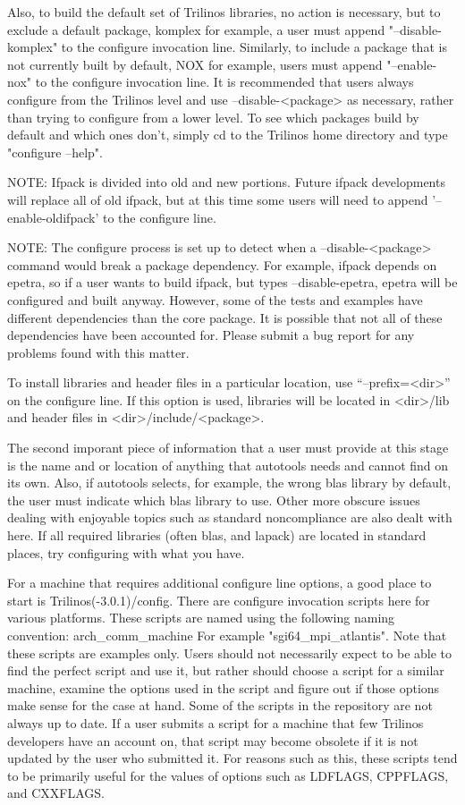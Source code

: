 \documentclass[12pt,relax]{TrilinosDevGuide}
\begin{document}
	Also, to build the default set of Trilinos libraries, no action is 
necessary, but to exclude a default package, komplex for example, a user must 
append "--disable-komplex" to the configure invocation  line.  Similarly, to 
include a package that is not currently built by default, NOX for example, 
users must append "--enable-nox" to the configure invocation line.  It is 
recommended that users always configure from the Trilinos level and use 
--disable-<package> as necessary, rather than trying to configure from a lower 
level.  To see which packages build by default and which ones don't, simply 
cd to the Trilinos home directory and type "configure --help".

NOTE: Ifpack is divided into old and new portions.  Future ifpack developments 
will replace all of old ifpack, but at this time some users will need to append
'--enable-oldifpack' to the configure line.

NOTE: The configure process is set up to detect when a --disable-<package> 
command would break a package dependency.  For example, ifpack depends on 
epetra, so if a user wants to build ifpack, but types --disable-epetra, epetra 
will be configured and built anyway.  However, some of the tests and examples 
have different dependencies than the core package.  It is possible that not 
all of these dependencies have been accounted for.  Please submit a bug report 
for any problems found with this matter.

	To install libraries and header files in a particular location, 
use ``--prefix=<dir>'' on the configure line.  If this option is used, 
libraries will be located in <dir>/lib and header files in 
<dir>/include/<package>.

	The second imporant piece of information that a user must provide at 
this stage is the name and or location of anything that autotools needs and 
cannot find on its own.  Also, if autotools selects, for example, the wrong 
blas library by default, the user must indicate which blas library to use.  
Other more obscure issues dealing with enjoyable topics such as standard 
noncompliance are also dealt with here.  If all required libraries (often 
blas, and lapack) are located in standard places, try configuring with what 
you have.

	For a machine that requires additional configure line options, a good 
place to start is Trilinos(-3.0.1)/config.  There are configure invocation 
scripts here for various platforms.  These scripts are named using the 
following naming convention:
arch\_comm\_machine
For example "sgi64\_mpi\_atlantis".  Note that these scripts are examples 
only.  Users should not necessarily expect to be able to find the perfect 
script and use it, but rather should choose a script for a similar machine, 
examine the options used in the script and figure out if those options make 
sense for the case at hand.  Some of the scripts in the repository are not 
always up to date.  If a user submits a script for a machine that few Trilinos 
developers have an account on, that script may become obsolete if it is not 
updated by the user who submitted it.  For reasons such as this, these scripts 
tend to be primarily useful for the values of options such as LDFLAGS, 
CPPFLAGS, and CXXFLAGS.  
\end{document}
